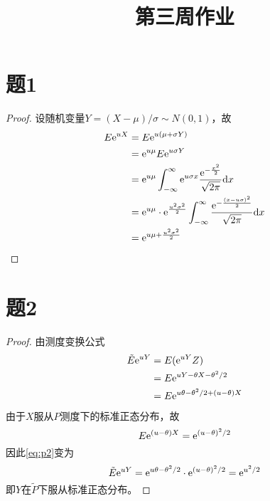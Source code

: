 \documentclass[cn]{homework}
\title{第三周作业}
\begin{document}
    \maketitle

    \section{题1}
    \begin{proof}
    设随机变量$Y=(X-\mu)/\sigma\sim N(0,1)$，故
    \begin{align*}
        E\mathrm e^{uX}&=E\mathrm e^{u(\mu+\sigma Y)}\\
                &=\mathrm e^{u\mu}E\mathrm e^{u\sigma Y}\\
                &=\mathrm e^{u\mu}
                    \int_{-\infty}^\infty
                      \mathrm e^{u\sigma x}\frac{\mathrm e^{-\frac{x^2}{2}}}{\sqrt{2\pi}}
                    \mathrm d x\\
                &=\mathrm e^{u\mu}\cdot\mathrm e^\frac{u^2\sigma^2}{2}
                    \int_{-\infty}^\infty
                    \frac{\mathrm e^{-\frac{(x-u\sigma)^2}{2}}}{\sqrt{2\pi}}
                    \mathrm d x\\
                &=\mathrm e^{u\mu+\frac{u^2\sigma^2}{2}}
    \end{align*}
    \end{proof}

    \section{题2}
    \begin{proof}
        由测度变换公式
        \begin{equation}
            \label{eq:p2}
            \begin{aligned}
            \tilde E\mathrm e^{uY}&=E(\mathrm e^{uY}Z)\\
                           &=E\mathrm e^{uY-\theta X-\theta^2/2}\\
                           &=E\mathrm e^{u\theta-\theta^2/2+(u-\theta)X}
            \end{aligned}
        \end{equation}
        由于$X$服从$P$测度下的标准正态分布，故
        \[E\mathrm e^{(u-\theta)X}=\mathrm e^{(u-\theta)^2/2}\]
        因此\cref{eq:p2}变为
        \[\tilde E\mathrm e^{uY}=\mathrm e^{u\theta-\theta^2/2}
        \cdot\mathrm e^{(u-\theta)^2/2}=\mathrm e^{u^2/2}\]
        即$Y$在$\tilde P$下服从标准正态分布。
    \end{proof}
\end{document}
